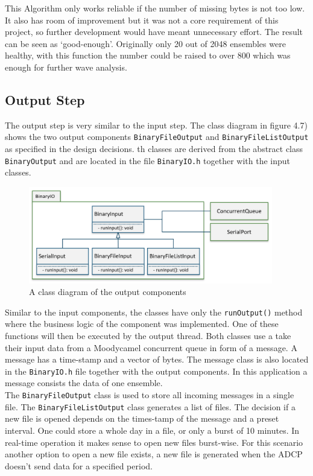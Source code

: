 This Algorithm only works reliable if the number of missing bytes is not too low. It also has room of improvement but it was not a core requirement of this project, so further development would have meant unnecessary effort. The result can be seen as `good-enough'. Originally only 20 out of 2048 ensembles were healthy, with this function the number could be raised to over 800 which was enough for further wave analysis.

\subsection{Output Step}
The output step is very similar to the input step. The class diagram in figure 4.7) shows the two output components \texttt{BinaryFileOutput} and \texttt{BinaryFileListOutput} as specified in the design decisions. th classes are derived from the abstract class \texttt{BinaryOutput} and are located in the file \texttt{BinaryIO.h} together with the input classes.

\begin{figure}[h]
\centering
      \includegraphics[width=0.95\textwidth]{input}
        \caption{A class diagram of the output components}
\end{figure}

Similar to the input components, the classes have only the \texttt{runOutput()} method where the business logic of the component was implemented. One of these functions will then be executed by the output thread. Both classes use a take their input data from a Moodycamel concurrent queue in form of a message. A message has a time-stamp and a vector of bytes. The message class is also located in the \texttt{BinaryIO.h} file together with the output components. In this application a message consists the data of one ensemble.\\ 
The \texttt{BinaryFileOutput} class is used to store all incoming messages in a single file. The \texttt{BinaryFileListOutput} class generates a list of files. The decision if a new file is opened depends on the times-tamp of the message and a preset interval. One could store a whole day in a file, or only a burst of 10 minutes. In real-time operation it makes sense to open new files burst-wise. For this scenario  another option to open a new file exists, a new file is generated when  the ADCP doesn't send data for a specified period.




 